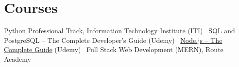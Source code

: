 \section*{Courses}
Python Professional Track, Information Technology Institute (ITI) \textbar\ SQL and PostgreSQL -- The Complete Developer's Guide (Udemy) \textbar\ \href{https://udemy-certificate.s3.amazonaws.com/image/UC-1915f7c1-c6fd-4351-8bf8-b6525184ef80.jpg?v=1782043676000}{Node.js -- The Complete Guide} (Udemy) \textbar\ Full Stack Web Development (MERN), Route Academy
